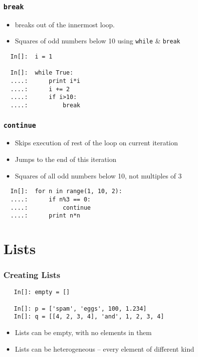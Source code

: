 \begin{frame}[fragile]
  \frametitle{\texttt{break}}
  \begin{itemize}
  \item breaks out of the innermost loop.
  \item Squares of odd numbers below 10 using \texttt{while} \&
    \texttt{break}
  \end{itemize}
  \begin{lstlisting}
  In[]:  i = 1

  In[]:  while True:
  ....:      print i*i
  ....:      i += 2
  ....:      if i>10:
  ....:          break
  \end{lstlisting}
\end{frame}

\begin{frame}[fragile]
  \frametitle{\texttt{continue}}
  \begin{itemize}
  \item Skips execution of rest of the loop on current iteration
  \item Jumps to the end of this iteration
  \item Squares of all odd numbers below 10, not multiples of 3
  \end{itemize}
  \begin{lstlisting}
  In[]:  for n in range(1, 10, 2):
  ....:      if n%3 == 0:
  ....:          continue      
  ....:      print n*n
  \end{lstlisting}
\end{frame}


\section{Lists}

\begin{frame}[fragile]
  \frametitle{Creating Lists}
  \begin{lstlisting}
   In[]: empty = [] 

   In[]: p = ['spam', 'eggs', 100, 1.234]
   In[]: q = [[4, 2, 3, 4], 'and', 1, 2, 3, 4]
  \end{lstlisting}
  \begin{itemize}
  \item Lists can be empty, with no elements in them
  \item Lists can be heterogeneous -- every element of different kind
  \end{itemize}
\end{frame}

